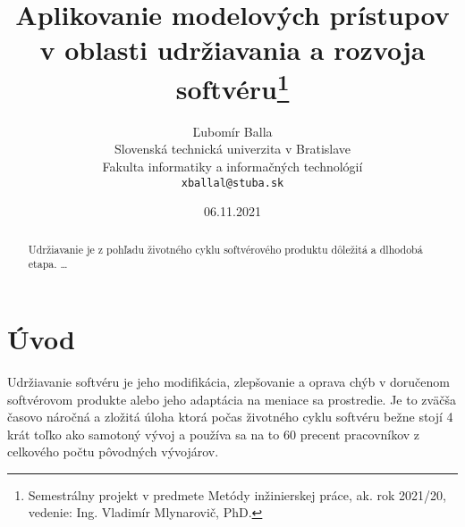 \documentclass[10pt,twoside,slovak,a4paper]{article}
\title{Aplikovanie modelových prístupov v oblasti udržiavania a rozvoja softvéru\thanks{Semestrálny projekt v predmete Metódy inžinierskej práce, ak. rok 2021/20, vedenie: Ing. Vladimír Mlynarovič, PhD.}} %
\author{Ľubomír Balla\\[2pt]
	{\small Slovenská technická univerzita v Bratislave}\\
	{\small Fakulta informatiky a informačných technológií}\\
	{\small \texttt{xballal@stuba.sk}}
	}
\date{\small 06.11.2021}
\begin{document}
\maketitle

\begin{abstract}
Udržiavanie je z pohľadu životného cyklu softvérového produktu dôležitá a dlhodobá etapa.
\ldots
\end{abstract}



\section{Úvod}

Udržiavanie softvéru je jeho modifikácia, zlepšovanie a oprava chýb v doručenom softvérovom produkte alebo jeho adaptácia na meniace sa prostredie.\cite{6116869} Je to zväčša časovo náročná a zložitá úloha ktorá počas životného cyklu softvéru bežne stojí 4 krát toľko ako samotoný vývoj a používa sa na to 60 precent pracovníkov z celkového počtu pôvodných vývojárov.
\end{document}
